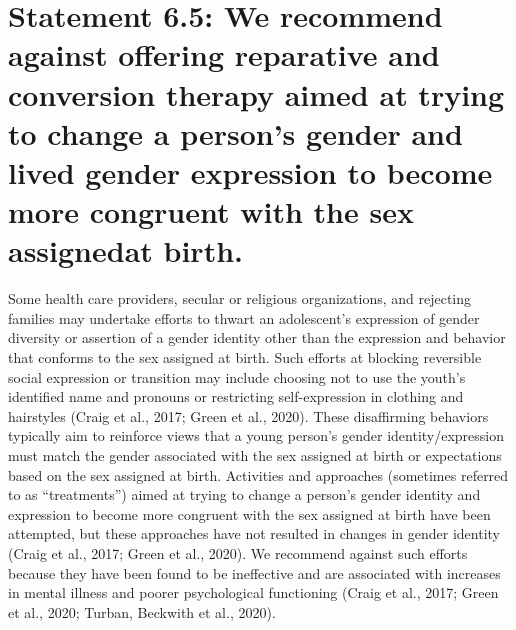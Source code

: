 \documentclass[
]{book}
\begin{document}
\hypertarget{statement-6.5-we-recommend-against-offering-reparative-and-conversion-therapy-aimed-at-trying-to-change-a-persons-gender-and-lived-gender-expression-to-become-more-congruent-with-the-sex-assignedat-birth.}{%
\section*{Statement 6.5: We recommend against offering reparative and conversion therapy aimed at trying to change a person's gender and lived gender expression to become more congruent with the sex assignedat birth.}\label{statement-6.5-we-recommend-against-offering-reparative-and-conversion-therapy-aimed-at-trying-to-change-a-persons-gender-and-lived-gender-expression-to-become-more-congruent-with-the-sex-assignedat-birth.}}

Some health care providers, secular or religious organizations, and rejecting families may
undertake efforts to thwart an adolescent's
expression of gender diversity or assertion of a
gender identity other than the expression and
behavior that conforms to the sex assigned at
birth. Such efforts at blocking reversible social
expression or transition may include choosing
not to use the youth's identified name and pronouns or restricting self-expression in clothing
and hairstyles (Craig et al., 2017; Green et al.,
2020). These disaffirming behaviors typically
aim to reinforce views that a young person's
gender identity/expression must match the gender associated with the sex assigned at birth or
expectations based on the sex assigned at birth.
Activities and approaches (sometimes referred
to as ``treatments'') aimed at trying to change a
person's gender identity and expression to
become more congruent with the sex assigned
at birth have been attempted, but these
approaches have not resulted in changes in gender identity (Craig et al., 2017; Green et al.,
2020). We recommend against such efforts
because they have been found to be ineffective
and are associated with increases in mental illness and poorer psychological functioning (Craig
et al., 2017; Green et al., 2020; Turban, Beckwith
et al., 2020).
\end{document}
